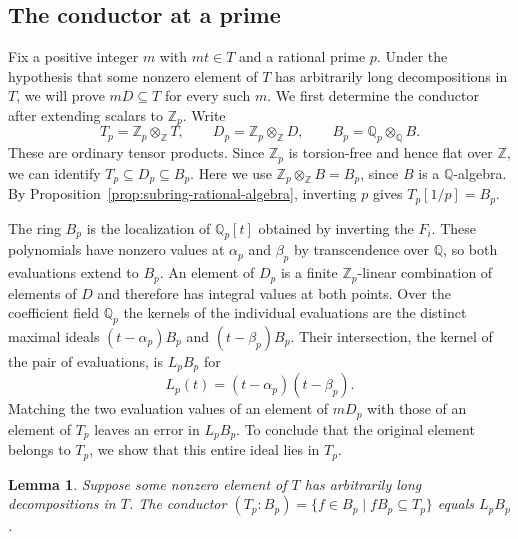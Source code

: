 \documentclass{article}
\newtheorem{lemma}[proposition]{Lemma}
\theoremstyle{remark}
\begin{document}
\subsection{The conductor at a prime}

Fix a positive integer $m$ with $mt \in T$ and a rational prime $p$.
Under the hypothesis that some nonzero element of $T$ has arbitrarily long decompositions in $T$, we will prove $mD \subseteq T$ for every such $m$.
We first determine the conductor after extending scalars to $\mathbb{Z}_p$.
Write
\[
    T_p = \mathbb{Z}_p \otimes_{\mathbb{Z}} T, \qquad
    D_p = \mathbb{Z}_p \otimes_{\mathbb{Z}} D, \qquad
    B_p = \mathbb{Q}_p \otimes_{\mathbb{Q}} B.
\]
These are ordinary tensor products.
Since $\mathbb{Z}_p$ is torsion-free and hence flat over $\mathbb{Z}$, we can identify $T_p \subseteq D_p \subseteq B_p$.
Here we use $\mathbb{Z}_p \otimes_{\mathbb{Z}} B = B_p$, since $B$ is a $\mathbb{Q}$-algebra.
By Proposition~\ref{prop:subring-rational-algebra}, inverting $p$ gives $T_p[1/p] = B_p$.

The ring $B_p$ is the localization of $\mathbb{Q}_p[t]$ obtained by inverting the $F_i$.
These polynomials have nonzero values at $\alpha_p$ and $\beta_p$ by transcendence over $\mathbb{Q}$, so both evaluations extend to $B_p$.
An element of $D_p$ is a finite $\mathbb{Z}_p$-linear combination of elements of $D$ and therefore has integral values at both points.
Over the coefficient field $\mathbb{Q}_p$ the kernels of the individual evaluations are the distinct maximal ideals $(t - \alpha_p)B_p$ and $(t - \beta_p)B_p$.
Their intersection, the kernel of the pair of evaluations, is $L_p B_p$ for
\[
    L_p(t) = (t - \alpha_p)(t - \beta_p).
\]
Matching the two evaluation values of an element of $mD_p$ with those of an element of $T_p$ leaves an error in $L_p B_p$.
To conclude that the original element belongs to $T_p$, we show that this entire ideal lies in $T_p$.

\begin{lemma}
    \label{lem:subring-local-conductor}
    Suppose some nonzero element of $T$ has arbitrarily long decompositions in $T$.
    The conductor $(T_p : B_p) = \{f \in B_p \mid f B_p \subseteq T_p\}$ equals $L_p B_p$.
\end{lemma}
\end{document}
